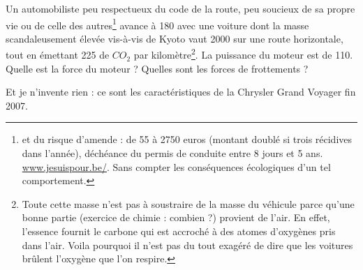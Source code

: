 

\begin{exercice}\label{exo030}

Un automobiliste peu respectueux du code de la route, peu soucieux de sa propre vie ou de celle des autres\footnote{et du risque d'amende : de 55 à 2750 euros (montant doublé si trois récidives dans l'année), déchéance du permis de conduite entre 8 jours et 5 ans. \url{www.jesuispour.be/}. Sans compter les conséquences écologiques d'un tel comportement.} avance à \unit{180}{\kilo\meter\per\hour} avec une voiture dont la masse scandaleusement élevée vis-à-vis de Kyoto vaut \unit{2000}{\kilogram} sur une route horizontale, tout en émettant \unit{225}{\gram} de $CO_2$ par kilomètre\footnote{Toute cette masse n'est pas à soustraire de la masse du véhicule parce qu'une bonne partie (exercice de chimie : combien ?) provient de l'air. En effet, l'essence fournit le carbone qui est accroché à des atomes d'oxygènes pris dans l'air. Voila pourquoi il n'est pas du tout exagéré de dire que les voitures brûlent l'oxygène que l'on respire.}. La puissance du moteur est de \unit{110}{\kilo\watt}. Quelle est la force du moteur ? Quelles sont les forces de frottements ?

Et je n'invente rien : ce sont les caractéristiques de la Chrysler Grand Voyager fin 2007. 

\end{exercice}
